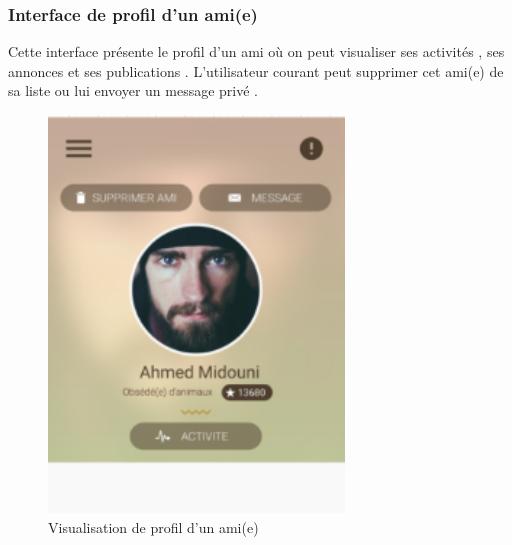 \documentclass[11pt,a4paper,oneside]{book}
\begin{document}
					\subsubsection{Interface de profil d'un ami(e)}
					Cette interface présente le profil d’un ami où on peut visualiser ses activités , ses annonces et ses publications . L’utilisateur courant peut supprimer cet ami(e) de sa liste ou lui envoyer un message privé .
					\begin{figure}[H]
						\centering
						\includegraphics[width=0.7\textwidth]{Images/ch4/friend}
						\caption{Visualisation de profil d'un ami(e)}
						\label{fig:05-view-friend-profile}
					\end{figure}\vfill\
\end{document}
